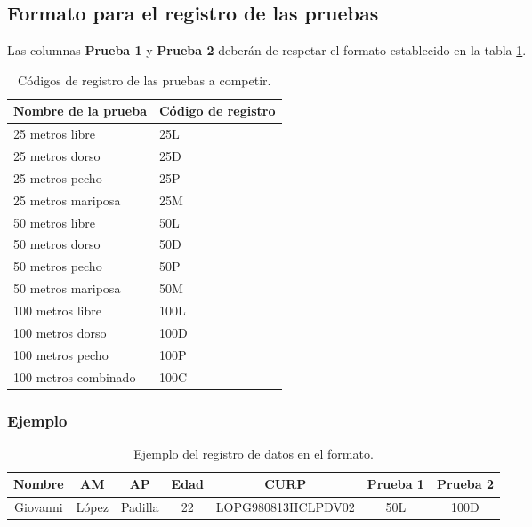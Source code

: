 \subsection{Formato para el registro de las pruebas}
Las columnas \textbf{Prueba 1} y \textbf{Prueba 2} deberán de respetar el formato establecido en la tabla \ref{table:codigos_de_pruebas}.
\begin{table}[H]
    \centering
    \begin{tabular}{ll}
        \hline
        \textbf{Nombre de la prueba} & \textbf{Código de registro} \\ \hline
        25 metros libre              & 25L                         \\
        25 metros dorso              & 25D                         \\
        25 metros pecho              & 25P                         \\
        25 metros mariposa           & 25M                         \\
        50 metros libre              & 50L                         \\
        50 metros dorso              & 50D                         \\
        50 metros pecho              & 50P                         \\
        50 metros mariposa           & 50M                         \\
        100 metros libre             & 100L                        \\
        100 metros dorso             & 100D                        \\
        100 metros pecho             & 100P                        \\
        100 metros combinado         & 100C                        \\ \hline
    \end{tabular}
    \caption{Códigos de registro de las pruebas a competir.}
    \label{table:codigos_de_pruebas}
\end{table}
\subsubsection{Ejemplo}
\begin{table}[H]
    \centering
    \begin{tabular}{ccccccc}
        \hline
        \textbf{Nombre} & \textbf{AM} & \textbf{AP} & \textbf{Edad} & \textbf{CURP}      & \textbf{Prueba 1} & \textbf{Prueba 2} \\
        \hline
        Giovanni        & López       & Padilla     & 22            & LOPG980813HCLPDV02 & 50L               & 100D              \\
        \hline
    \end{tabular}
    \caption{Ejemplo del registro de datos en el formato.}
    \label{table:format_example}
\end{table}

